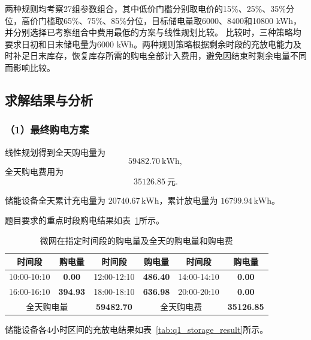 两种规则均考察27组参数组合，其中低价门槛分别取电价的15\%、25\%、35\%分位，高价门槛取65\%、75\%、85\%分位，目标储电量取6000、8400和10800 kWh，并分别选择已考察组合中费用最低的方案与线性规划比较。
比较时，三种策略均要求日初和日末储电量为6000 kWh。两种规则策略根据剩余时段的充放电能力及时补足日末库存，恢复库存所需的购电全部计入费用，避免因结束时剩余电量不同而影响比较。

\subsection{求解结果与分析}

\subsubsection*{（1）最终购电方案}

线性规划得到全天购电量为
\[
\boxed{59482.70\ \mathrm{kWh}},
\]
全天购电费用为
\[
\boxed{35126.85\ \text{元}}.
\]

储能设备全天累计充电量为 \(20740.67\,\mathrm{kWh}\)，累计放电量为 \(16799.94\,\mathrm{kWh}\)。

题目要求的重点时段购电结果如表~\ref{tab:q1_purchase_result}所示。

\begin{table}[H]
    \centering
    \caption{微网在指定时间段的购电量及全天的购电量和购电费 }
    \label{tab:q1_purchase_result}
    \begin{tabular}{|c|c|c|c|c|c|}
        \hline
        时间段 & 购电量 & 时间段 & 购电量 & 时间段 & 购电量 \\
        \hline
        10:00-10:10 & \textbf{0.00} & 12:00-12:10 & \textbf{486.40} & 14:00-14:10 & \textbf{0.00} \\
        \hline
        16:00-16:10 & \textbf{394.93} & 18:00-18:10 & \textbf{636.98} & 20:00-20:10 & \textbf{0.00} \\
        \hline
        \multicolumn{2}{|c|}{全天购电量} & \multicolumn{1}{c|}{\textbf{59482.70}} & \multicolumn{2}{c|}{全天购电费} & \multicolumn{1}{c|}{\textbf{35126.85}}\\
        \hline
    \end{tabular}
\end{table}

储能设备各4小时区间的充放电结果如表~\ref{tab:q1_storage_result}所示。


